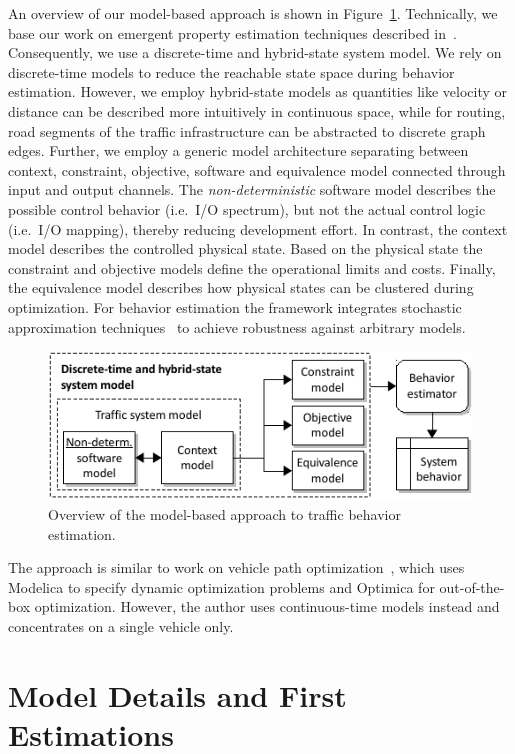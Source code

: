 \documentclass[conference]{../cls/IEEEtran}
\begin{document}
An overview of our model-based approach is shown in Figure~\ref{fig:framework}.
Technically, we base our work on emergent property estimation techniques
described in~\cite{Hackenberg2012}. Consequently, we use a discrete-time and
hybrid-state system model. We rely on discrete-time models to reduce the
reachable state space during behavior estimation. However, we employ hybrid-state models as quantities like velocity or distance can be described more intuitively in continuous space, while for routing, road segments of the traffic infrastructure can be abstracted to discrete graph edges. Further, we employ a generic model architecture separating between context, constraint, objective, software and equivalence model connected through input and output channels. The \textit{non-deterministic} software model describes the possible control behavior (i.e.\ I/O spectrum), but not the actual control logic (i.e.\ I/O mapping), thereby reducing development effort. In contrast, the context model describes the controlled physical state. Based on the physical state the constraint and objective models define the operational limits and costs. Finally, the equivalence model describes how physical states can be clustered during optimization. For behavior estimation the framework integrates stochastic approximation techniques~\cite{Pereira1991} to achieve robustness against arbitrary models.

\begin{figure}[h]
	\centering
	\includegraphics{../gfx/framework.pdf}
	\caption{Overview of the model-based approach to traffic behavior estimation.}
	\label{fig:framework}
\end{figure}

The approach is similar to work on vehicle path optimization~\cite{Danielsson2007}, which uses Modelica to specify dynamic optimization problems and Optimica for out-of-the-box optimization. However, the author uses continuous-time models instead and concentrates on a single vehicle only.

\section{Model Details and First Estimations}
\end{document}
